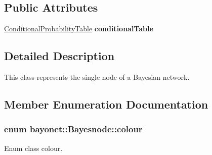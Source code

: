\subsection*{Public Attributes}
\begin{DoxyCompactItemize}
\item 
\hypertarget{classbayonet_1_1_bayesnode_acad93115ce4cfce21ce35a4a5ddebc1e}{\hyperlink{classbayonet_1_1_conditional_probability_table}{Conditional\-Probability\-Table} {\bfseries conditional\-Table}}\label{classbayonet_1_1_bayesnode_acad93115ce4cfce21ce35a4a5ddebc1e}

\end{DoxyCompactItemize}


\subsection{Detailed Description}
This class represents the single node of a Bayesian network. 



 

\subsection{Member Enumeration Documentation}
\hypertarget{classbayonet_1_1_bayesnode_aaf4b5ea18ef0c14f2baae9bff0ef9199}{
\subsubsection[{colour}]{\setlength{\rightskip}{0pt plus 5cm}enum {\bf bayonet\-::\-Bayesnode\-::colour}}}\label{classbayonet_1_1_bayesnode_aaf4b5ea18ef0c14f2baae9bff0ef9199}


Enum class colour. 

